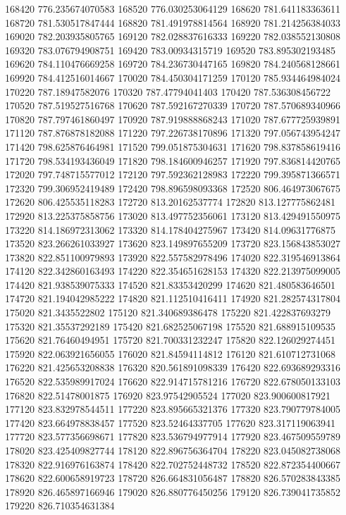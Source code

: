 {168420 776.235674070583
168520 776.030253064129
168620 781.641183363611
168720 781.530517847444
168820 781.491978814564
168920 781.214256384033
169020 782.203935805765
169120 782.028837616333
169220 782.038552130808
169320 783.076794908751
169420 783.00934315719
169520 783.895302193485
169620 784.110476669258
169720 784.236730447165
169820 784.240568128661
169920 784.412516014667
170020 784.450304171259
170120 785.934464984024
170220 787.18947582076
170320 787.47794041403
170420 787.536308456722
170520 787.519527516768
170620 787.592167270339
170720 787.570689340966
170820 787.797461860497
170920 787.919888868243
171020 787.677725939891
171120 787.876878182088
171220 797.226738170896
171320 797.056743954247
171420 798.625876464981
171520 799.051875304631
171620 798.837858619416
171720 798.534193436049
171820 798.184600946257
171920 797.836814420765
172020 797.748715577012
172120 797.592362128983
172220 799.395871366571
172320 799.306952419489
172420 798.896598093368
172520 806.464973067675
172620 806.425535118283
172720 813.20162537774
172820 813.127775862481
172920 813.225375858756
173020 813.497752356061
173120 813.429491550975
173220 814.186972313062
173320 814.178404275967
173420 814.09631776875
173520 823.266261033927
173620 823.149897655209
173720 823.156843853027
173820 822.851100979893
173920 822.557582978496
174020 822.319546913864
174120 822.342860163493
174220 822.354651628153
174320 822.213975099005
174420 821.938539075333
174520 821.83353420299
174620 821.480583646501
174720 821.194042985222
174820 821.112510416411
174920 821.282574317804
175020 821.3435522802
175120 821.340689386478
175220 821.422837693279
175320 821.35537292189
175420 821.682525067198
175520 821.688915109535
175620 821.76460494951
175720 821.700331232247
175820 822.126029274451
175920 822.063921656055
176020 821.84594114812
176120 821.610712731068
176220 821.425653208838
176320 820.561891098339
176420 822.693689293316
176520 822.535989917024
176620 822.914715781216
176720 822.678050133103
176820 822.51478001875
176920 823.97542905524
177020 823.900600817921
177120 823.832978544511
177220 823.895665321376
177320 823.790779784005
177420 823.664978838457
177520 823.52464337705
177620 823.317119063941
177720 823.577356698671
177820 823.536794977914
177920 823.467509559789
178020 823.425409827744
178120 822.896756364704
178220 823.045082738068
178320 822.916976163874
178420 822.702752448732
178520 822.872354400667
178620 822.600658919723
178720 826.664831056487
178820 826.570283843385
178920 826.465897166946
179020 826.880776450256
179120 826.739041735852
179220 826.710354631384
}
